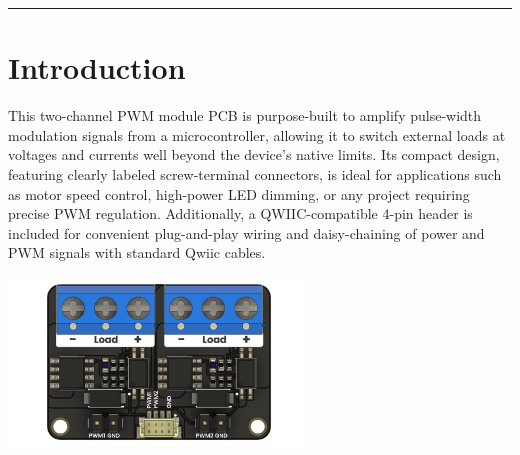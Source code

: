\documentclass[10pt]{article}
\title{}
\author{}
\date{}
\begin{document}
\noindent
{}
\vspace{1em}
\hrule
\vspace{1.5em}

\section*{Introduction}
\vspace{0.5em}
\noindent
\begin{minipage}[t]{0.62\textwidth}
\setlength{\parskip}{0.75em}
\justifying
This two-channel PWM module PCB is purpose-built to amplify pulse-width modulation signals from a microcontroller, allowing it to switch external loads at voltages and currents well beyond the device’s native limits. Its compact design, featuring clearly labeled screw-terminal connectors, is ideal for applications such as motor speed control, high-power LED dimming, or any project requiring precise PWM regulation. Additionally, a QWIIC-compatible 4-pin header is included for convenient plug-and-play wiring and daisy-chaining of power and PWM signals with standard Qwiic cables.
\end{minipage}
\hfill
\begin{minipage}[t]{0.35\textwidth}
\centering
\vspace{-0.5em}
\includegraphics[height=4.5cm,keepaspectratio]{./images/product.jpg}
\end{minipage}

\vspace{1.0em}
\FloatBarrier %
\end{document}
